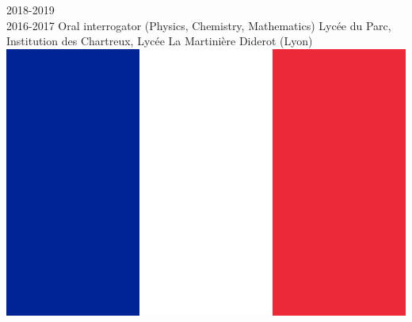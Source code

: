 \documentclass[letterpaper]{cvtemplate_en} %
\begin{document}
\begin{cvbody}
\cvitem
	{2018-2019\\ \mbox{}\hfill 2016-2017}
	{}
	{Oral interrogator (Physics, Chemistry, Mathematics)}
	{Lyc\'ee du Parc, Institution des Chartreux, Lyc\'ee La Martinière Diderot (Lyon) \includegraphics[height=0.8\myheight]{fr}}
	{}{}{}
	{}
	{\vspace{5pt}
	}



\end{cvbody}
\end{document}
